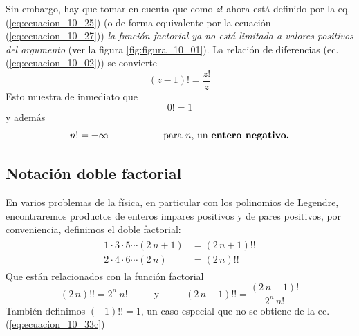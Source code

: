 Sin embargo, hay que tomar en cuenta que como $z!$ ahora está definido por la eq. (\ref{eq:ecuacion_10_25}) (o de forma equivalente por la ecuación (\ref{eq:ecuacion_10_27})) \emph{la función factorial ya no está limitada a valores positivos del argumento} (ver la figura \ref{fig:figura_10_01}).
La relación de diferencias (ec. (\ref{eq:ecuacion_10_02})) se convierte
\begin{equation}
(z - 1)! = \dfrac{z!}{z}
\label{eq:ecuacion_10_29}
\end{equation}
Esto muestra de inmediato que
\begin{equation}
0!= 1
\label{eq:ecuacion_10_30}
\end{equation}
y además
\begin{equation}
n! = \pm \infty \hspace{2cm} \mbox{para $n$, un \textbf{entero negativo.}}
\label{eq:ecuacion_10_31}
\end{equation}
\newpage
\subsection{Notación doble factorial}
En varios problemas de la física, en particular con los polinomios de Legendre, encontraremos productos de enteros impares positivos y de pares positivos, por conveniencia, definimos el doble factorial:
\begin{align}
\begin{aligned}
1 \cdot 3 \cdot 5 \cdots (2 \, n+1) &= (2 \, n+1) !! \\
2 \cdot 4 \cdot 6 \cdots (2 \, n) &= (2 \, n) !!
\end{aligned}
\label{eq:ecuacion_10_33b}
\end{align}
Que están relacionados con la función factorial
\begin{equation}
(2 \, n)!! =  2^{n} \: n! \hspace{1cm} \mbox{ y } \hspace{1cm} (2 \, n+1)!! = \dfrac{(2 \, n+1)!}{2^{n} \, n!}
\label{eq:ecuacion_10_33c}
\end{equation}
También definimos $(-1)!! = 1$, un caso especial que no se obtiene de la ec. (\ref{eq:ecuacion_10_33c})
